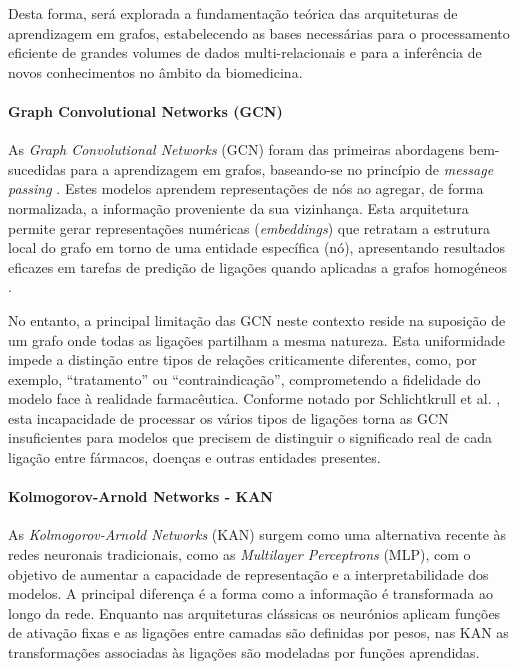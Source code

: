 Desta forma, será explorada a fundamentação teórica das arquiteturas de aprendizagem em grafos, estabelecendo as bases necessárias para o processamento eficiente de grandes volumes de dados multi-relacionais e para a inferência de novos conhecimentos no âmbito da biomedicina.

\paragraph{Graph Convolutional Networks (GCN)}
As \emph{Graph Convolutional Networks} (GCN) foram das primeiras abordagens bem-sucedidas para a aprendizagem em grafos, baseando-se no princípio de \emph{message passing} \cite{Zhang2019}. Estes modelos aprendem representações de nós ao agregar, de forma normalizada, a informação proveniente da sua vizinhança. Esta arquitetura permite gerar representações numéricas (\emph{embeddings}) que retratam a estrutura local do grafo em torno de uma entidade específica (nó), apresentando resultados eficazes em tarefas de predição de ligações quando aplicadas a grafos homogéneos \cite{Wu2021}.

No entanto, a principal limitação das GCN neste contexto reside na suposição de um grafo onde todas as ligações partilham a mesma natureza. Esta uniformidade impede a distinção entre tipos de relações criticamente diferentes, como, por exemplo, \enquote{tratamento} ou \enquote{contraindicação}, comprometendo a fidelidade do modelo face à realidade farmacêutica. Conforme notado por Schlichtkrull et al. \cite{schlichtkrull2018modeling}, esta incapacidade de processar os vários tipos de ligações torna as GCN insuficientes para modelos que precisem de distinguir o significado real de cada ligação entre fármacos, doenças e outras entidades presentes.

\paragraph{Kolmogorov-Arnold Networks - KAN}
As \emph{Kolmogorov-Arnold Networks} (KAN) \cite{liu2025kankolmogorovarnoldnetworks} surgem como uma alternativa recente às redes neuronais tradicionais, como as \emph{Multilayer Perceptrons} (MLP), com o objetivo de aumentar a capacidade de representação e a interpretabilidade dos modelos. A principal diferença é a forma como a informação é transformada ao longo da rede. Enquanto nas arquiteturas clássicas os neurónios aplicam funções de ativação fixas e as ligações entre camadas são definidas por pesos, nas KAN as transformações associadas às ligações são modeladas por funções aprendidas.


